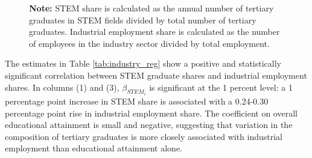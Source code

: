 \documentclass[12pt]{article} %
\theoremstyle{definition}
\begin{document}
\begin{figure}[htbp]

    \begin{minipage}{0.7\textwidth}  %
        \footnotesize
        \textbf{Note:} STEM share is calculated as the annual number of tertiary graduates in STEM fields divided by total number of tertiary graduates. Industrial employment share is calculated as the number of employees in the industry sector divided by total employment.
    \end{minipage}
    
\end{figure}






The estimates in Table \ref{tab:industry_reg} show a positive and statistically significant correlation between STEM graduate shares and industrial employment shares. In columns (1) and (3),  $\beta_{STEM_i}$ is significant at the 1 percent level: a 1 percentage point increase in STEM share is associated with a 0.24-0.30 percentage point rise in industrial employment share. The coefficient on overall educational attainment is small and negative, suggesting that variation in the composition of tertiary graduates is more closely associated with industrial employment than educational attainment alone. 
\end{document}
